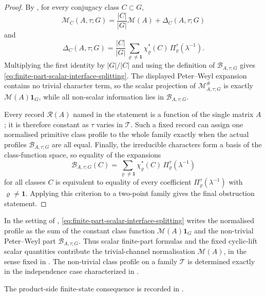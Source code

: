 \begin{proof}
  By , for every conjugacy class
  \(C\subset G\),
  \[
    \mathcal M_C(A,\tau;G)
    =
    \frac{|C|}{|G|}\mathcal M(A)+\Delta_C(A,\tau;G)
  \]
  and
  \[
    \Delta_C(A,\tau;G)
    =
    \frac{|C|}{|G|}
      \sum_{\varrho\neq\mathbf1}
        \chi_\varrho^\ast(C)\,\Pi_\varrho^\tau(\lambda^{-1}).
  \]
  Multiplying the first identity by \(|G|/|C|\) and using the definition
  of \(\mathcal B_{A,\tau;G}\) gives
  \eqref{eq:finite-part-scalar-interface-splitting}. The displayed
  Peter--Weyl expansion contains no trivial character term, so the scalar
  projection of \(\mathcal M^\#_{A,\tau;G}\) is exactly
  \(\mathcal M(A)\mathbf1_G\), while all non-scalar information lies in
  \(\mathcal B_{A,\tau;G}\).

  Every record \(\mathcal R(A)\) named in the statement is a function of
  the single matrix \(A\); it is therefore constant as \(\tau\) varies in
  \(\mathscr T\). Such a fixed record can assign one normalised primitive
  class profile to the whole family exactly when the actual profiles
  \(\mathcal B_{A,\tau;G}\) are all equal. Finally, the irreducible
  characters form a basis of the class-function space, so equality of the
  expansions
  \[
    \mathcal B_{A,\tau;G}(C)
    =
    \sum_{\varrho\neq\mathbf1}
      \chi_\varrho^\ast(C)\,\Pi_\varrho^\tau(\lambda^{-1})
  \]
  for all classes \(C\) is equivalent to equality of every coefficient
  \(\Pi_\varrho^\tau(\lambda^{-1})\) with
  \(\varrho\neq\mathbf1\). Applying this criterion to a two-point family
  gives the final obstruction statement.
\end{proof}


\begin{remark}
  \label{rem:fixed-matrix-scalar-interface-only}
  In the setting of ,
  \eqref{eq:finite-part-scalar-interface-splitting} writes the normalised
  profile as the sum of the constant class function
  \(\mathcal M(A)\mathbf1_G\) and the non-trivial Peter--Weyl part
  \(\mathcal B_{A,\tau;G}\).  Thus scalar finite-part formulas and the fixed
  cyclic-lift scalar quantities contribute the trivial-channel normalisation
  \(\mathcal M(A)\), in the sense fixed in
  .  The non-trivial class profile on a family
  \(\mathscr T\) is determined exactly in the independence case characterized in
  .
\end{remark}

\noindent
The product-side finite-state consequence is recorded in
.

